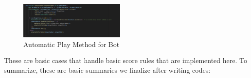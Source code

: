 \documentclass[conference]{IEEEtran}
\begin{document}
\begin{itemize}
    \begin{figure}[h!]
        \centering
        \includegraphics[width=0.47\textwidth]{img/Screenshot 2025-01-17 151307.png} %
        \caption{Automatic Play Method for Bot}
        \label{fig:case}
    \end{figure}
\end{itemize}



These are basic cases that handle basic score rules that are implemented here.
To summarize, these are basic summaries we finalize after writing codes:
\end{document}
